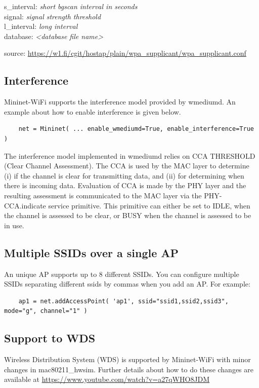 \noindent s\_interval: \textit{short bgscan interval in seconds} \\
signal: \textit{signal strength threshold} \\
l\_interval: \textit{long interval} \\
database: \textit{<database file name>}

\noindent source: \url{https://w1.fi/cgit/hostap/plain/wpa_supplicant/wpa_supplicant.conf}

\subsection{Interference}
Mininet-WiFi supports the interference model provided by wmediumd. An example about how to enable interference is given below.

\begin{verbatim}
    net = Mininet( ... enable_wmediumd=True, enable_interference=True )
\end{verbatim}

The interference model implemented in wmediumd relies on CCA THRESHOLD (Clear Channel Assessment). The CCA is used by the MAC layer to determine (i) if the channel is clear for transmitting data, and (ii) for determining when there is incoming data. Evaluation of CCA is made by the PHY layer and the resulting assessment is communicated to the MAC layer via the PHY-CCA.indicate service primitive. This primitive can either be set to IDLE, when the channel is assessed to be clear, or BUSY when the channel is assessed to be in use.


\subsection{Multiple SSIDs over a single AP}
An unique AP supports up to 8 different SSIDs. You can configure multiple SSIDs separating different ssids by commas when you add an AP. For example:

\begin{verbatim}
    ap1 = net.addAccessPoint( 'ap1', ssid="ssid1,ssid2,ssid3", mode="g", channel="1" )
\end{verbatim}

\subsection{Support to WDS}
Wireless Distribution System (WDS) is supported by Mininet-WiFi with minor changes in mac80211\_hwsim. Further details about how to do these changes are available at \url{https://www.youtube.com/watch?v=a27qWHO8JDM}

